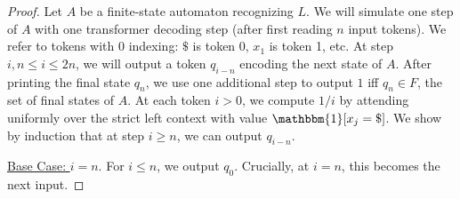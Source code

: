 \documentclass{article} %
\newcommand\change[1]{{\color{blue} #1}}
\newcommand\changeB[1]{{\color{purple} #1}}
\renewcommand\change[1]{#1}
\renewcommand\changeB[1]{#1}
\begin{document}
\begin{proof}
\change{Let $A$ be a finite-state automaton recognizing $L$.}
We will simulate one step of $A$ with one transformer decoding step (after first reading $n$ input tokens).
\changeB{We refer to tokens with $0$ indexing: $\$$ is token 0, $x_1$ is token 1, etc.}
At step $i, n \leq i \leq 2n$,
we will output a token $q_{i-n}$ encoding the next state of $A$. After printing the final state $q_n$, we use one additional step to output $1$ iff $q_n \in F$, \change{the set of final states of $A$}.
\changeB{At each token $i > 0$, we compute $1/i$ by attending uniformly over the strict left context with value $\mathbbm{1}[x_j = \$]$.} \change{We show by induction that at step $i \geq n$, we can output $q_{i-n}$.}

\underline{Base Case: $i=n$}.
\changeB{For $i \leq n$, we output $q_0$. Crucially, at $i=n$, this becomes the next input.}


\end{proof}
\end{document}
